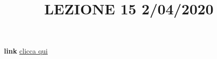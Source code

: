 \newline
\newline
\title{LEZIONE 15 2/04/2020}\newline
\textbf{link} \href{https://web.microsoftstream.com/video/208fe47d-34d0-49da-8f31-916e1297a91b?list=user&userId=faa91214-a6f5-40d7-8875-253fd49b8ce1}{clicca qui}